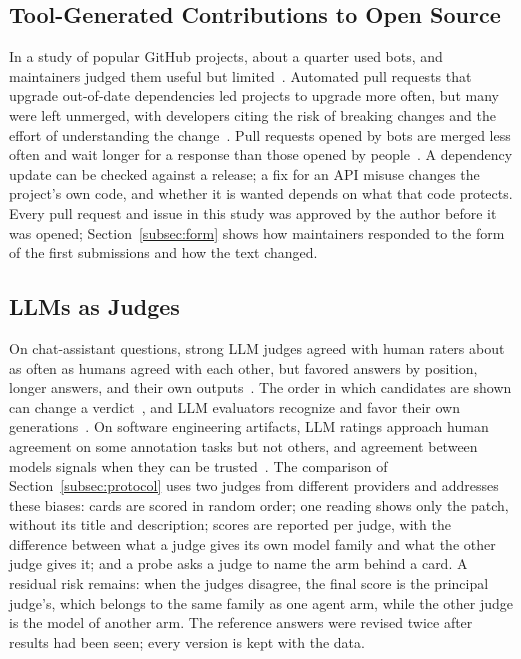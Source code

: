 \documentclass[conference]{IEEEtran}
\begin{document}
\subsection{Tool-Generated Contributions to Open Source}
\label{subsec:bots}

In a study of popular GitHub projects, about a quarter used bots, and
maintainers judged them useful but limited~\cite{wessel2018bots}. Automated
pull requests that upgrade out-of-date dependencies led projects to upgrade
more often, but many were left unmerged, with developers citing the risk of
breaking changes and the effort of understanding the
change~\cite{mirhosseini2017autopr}. Pull requests opened by bots are merged
less often and wait longer for a response than those opened by
people~\cite{wyrich2021botprs}. A dependency update can be checked against a
release; a fix for an API misuse changes the project's own code, and whether it
is wanted depends on what that code protects. Every pull request and issue in
this study was approved by the author before it was opened;
Section~\ref{subsec:form} shows how maintainers responded to the form of the
first submissions and how the text changed.

\subsection{LLMs as Judges}
\label{subsec:judges-bg}

On chat-assistant questions, strong LLM judges agreed with human raters about
as often as humans agreed with each other, but favored answers by position,
longer answers, and their own outputs~\cite{zheng2023judge}. The order in which
candidates are shown can change a verdict~\cite{wang2024fair}, and LLM
evaluators recognize and favor their own
generations~\cite{panickssery2024selfpref}. On software engineering artifacts,
LLM ratings approach human agreement on some annotation tasks but not others,
and agreement between models signals when they can be
trusted~\cite{ahmed2025annotation}. The comparison of
Section~\ref{subsec:protocol} uses two judges from different providers and
addresses these biases: cards are scored in random order; one reading shows
only the patch, without its title and description; scores are reported per
judge, with the difference between what a judge gives its own model family and
what the other judge gives it; and a probe asks a judge to name the arm behind
a card. A residual risk remains: when the judges disagree, the final score is
the principal judge's, which belongs to the same family as one agent arm, while
the other judge is the model of another arm. The reference answers were
revised twice after results had been seen; every version is kept with the
data.
\end{document}

